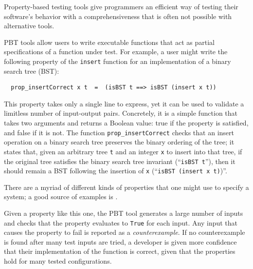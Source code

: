 Property-based testing tools give programmers
an efficient way of testing their software's behavior with a
comprehensiveness that is often not possible with alternative tools.

PBT tools allow users to write executable functions
that act as partial
specifications of a function under test. For example, a user might
write the following property of the \lstinline{insert}
function for an implementation of a binary search tree (BST):
\begin{lstlisting}
  prop_insertCorrect x t  =  (isBST t ==> isBST (insert x t))
\end{lstlisting}
This property takes only a single
line to express, yet it can be used to validate a limitless number of
input-output pairs. Concretely, it is
a simple function that takes two arguments and returns a
Boolean value: true if the property is satisfied, and false if it is
not. The function \texttt{prop\_insertCorrect} checks
that an insert operation on a binary search tree preserves the
binary ordering of the tree; it states
that, given an arbitrary tree \texttt{t} and an integer
\texttt{x} to insert into that tree, if the original tree
satisfies the
binary search tree invariant (``\texttt{isBST t}''), then it should remain
a BST following the insertion of \texttt{x} (``\texttt{isBST (insert x t)})''.

\iflater {}There are a
myriad of different kinds of properties that one might use to specify
a system; a good source of examples is \citet{HowToSpecifyIt}.  \fi

Given a property like this one, the PBT tool generates a large number of inputs and
checks that the property evaluates to \lstinline{True} for each input.
Any input that causes the property to fail is reported as a {\em
counterexample}. If no counterexample is found after many test
inputs are tried, a developer is given more confidence that their implementation
of the function is correct, given that the properties hold for many
tested configurations.


